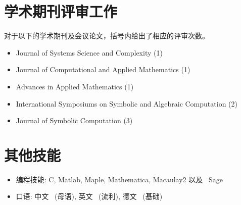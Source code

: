 \documentclass[a4paper,12pt]{article}
\begin{document}
\begin{CJK*}{UTF8}{gbsn}
\section*{\Large 学术期刊评审工作}
对于以下的学术期刊及会议论文，括号内给出了相应的评审次数。
\begin{itemize}
\item Journal of Systems Science and Complexity (1)
 \item Journal of Computational and Applied Mathematics (1)
 \item Advances in Applied Mathematics (1)
 \item International Symposiums on Symbolic and Algebraic Computation (2)
 \item Journal of Symbolic Computation (3)
\end{itemize}

\section*{\Large{其他技能}}
\begin{itemize}
 \item 编程技能: C, Matlab, Maple, Mathematica, Macaulay2 以及 \ Sage
 \item 口语: 中文 \ (母语), 英文 \ (流利), 德文 \ (基础)
\end{itemize}


\end{CJK*}
\end{document}
